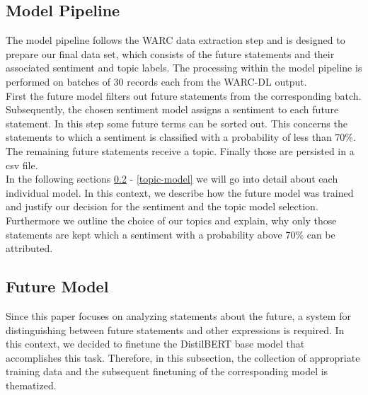 \subsection{Model Pipeline}
\label{model-pipeline}
The model pipeline follows the WARC data extraction step and is designed to prepare our final data set, which consists of the future statements and their associated sentiment and topic labels.
The processing within the model pipeline is performed on batches of 30 records each from the WARC-DL output.
\\
First the future model filters out future statements from the corresponding batch.
Subsequently, the chosen sentiment model assigns a sentiment to each future statement.
In this step some future terms can be sorted out.
This concerns the statements to which a sentiment is classified with a probability of less than 70\%.
The remaining future statements receive a topic.
Finally those are persisted in a csv file.
\\
In the following sections \ref{future-model} - \ref{topic-model} we will go into detail about each individual model.
In this context, we describe how the future model was trained and justify our decision for the sentiment and the topic model selection.
Furthermore we outline the choice of our topics and explain, why only those statements are kept which a sentiment with a probability above 70\% can be attributed.

\subsection{Future Model}
\label{future-model}
Since this paper focuses on analyzing statements about the future, a system for distinguishing between future statements and other expressions is required.
In this context, we decided to finetune the DistilBERT \citep{Sanh2019DistilBERTAD} base model that accomplishes this task.
Therefore, in this subsection, the collection of appropriate training data and the subsequent finetuning of the corresponding model is thematized.

